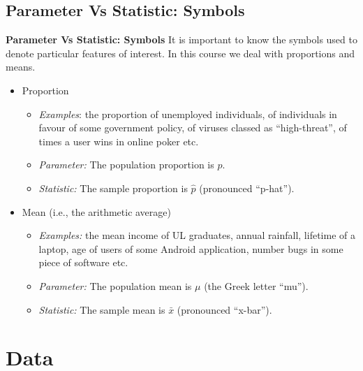 \documentclass[]{report}
\begin{document}
		
		\subsection{Parameter Vs Statistic: Symbols}
		{ \textbf{Parameter Vs Statistic: Symbols}}
		It is important to know the symbols used to denote particular features of interest. In this course we deal with { proportions} and { means}.
		
		\begin{itemize}\itemsep0.4cm
			\item { Proportion}
			\begin{itemize}\itemsep0.2cm
				\item \emph{Examples}: the proportion of unemployed individuals, of individuals in favour of some government policy, of viruses classed as ``high-threat'', of times a user wins in online poker etc.
				\item \emph{Parameter:} The population proportion is {\boldmath$p$}.
				\item \emph{Statistic:} The sample proportion is {\boldmath$\hat p$} (pronounced ``p-hat'').
			\end{itemize}
			\item { Mean} (i.e., the arithmetic average)
			\begin{itemize}\itemsep0.2cm
				\item \emph{Examples:} the mean income of UL graduates, annual rainfall, lifetime of a laptop, age of users of some Android application, number bugs in some piece of software etc.
				\item \emph{Parameter:} The population mean is {\boldmath$\mu$} (the Greek letter ``mu'').
				\item \emph{Statistic:} The sample mean is {\boldmath$\bar x$} (pronounced ``x-bar'').
			\end{itemize}
		\end{itemize}
		
		
		\section{Data}
\end{document}
